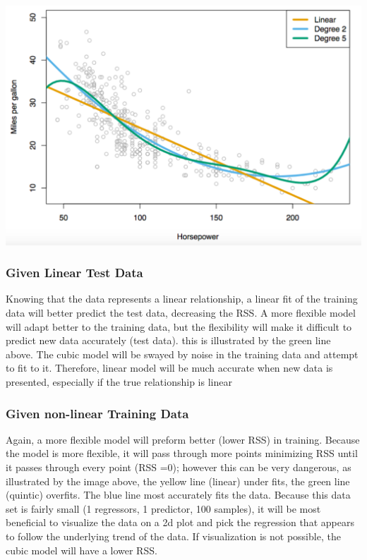 \documentclass[11pt]{article}
\makeatletter
\def\maxwidth{\ifdim\Gin@nat@width>\linewidth\linewidth
    \else\Gin@nat@width\fi}
\let\Oldincludegraphics\includegraphics
\renewcommand{\includegraphics}[1]{\Oldincludegraphics[width=.8\maxwidth]{#1}}
\makeatother
\begin{document}
\includegraphics{interpolation_example}

    \subsubsection{Given Linear Test Data}\label{given-linear-training-data}

Knowing that the data represents a linear relationship, a linear fit of
the training data will better predict the test data, decreasing the RSS.
A more flexible model will adapt better to the training data, but the
flexibility will make it difficult to predict new data accurately (test
data). this is illustrated by the green line above. The cubic model will
be swayed by noise in the training data and attempt to fit to it.
Therefore, linear model will be much accurate when new data is
presented, especially if the true relationship is linear

    \subsubsection{Given non-linear Training Data}\label{given-non-linear-training-data}

Again, a more flexible model will preform better (lower RSS) in
training. Because the model is more flexible, it will pass through more
points minimizing RSS until it passes through every point (RSS =0);
however this can be very dangerous, as illustrated by the image above,
the yellow line (linear) under fits, the green line (quintic) overfits.
The blue line most accurately fits the data. Because this data set is
fairly small (1 regressors, 1 predictor, 100 samples), it will be most
beneficial to visualize the data on a 2d plot and pick the regression
that appears to follow the underlying trend of the data. If
visualization is not possible, the cubic model will have a lower RSS.
\end{document}
